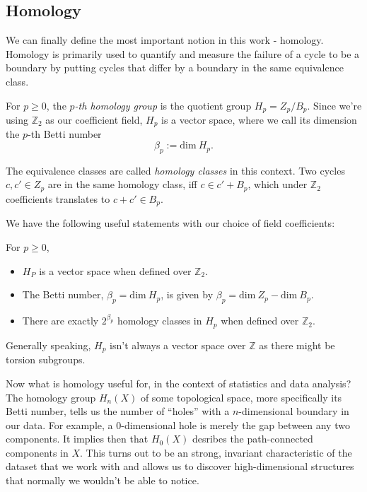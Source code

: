 \subsection{Homology}

We can finally define the most important notion in this work - homology. Homology is primarily used to quantify and measure the failure of a cycle to be a boundary by putting cycles that differ by a boundary in the same equivalence class.

\begin{definition}
  For $p \geq 0$, the \textit{$p$-th homology group} is the quotient group $H_{p} = Z_{p} / B_{p}$. Since we're using $\mathbb{Z}_{2}$ as our coefficient field, $H_{p}$ is a vector space, where we call its dimension the $p$-th Betti number
  \begin{equation*}
    \beta_{p} := \text{dim} \: H_{p}.
  \end{equation*}
\end{definition}

The equivalence classes are called \textit{homology classes} in this context. Two cycles $c, c' \in Z_{p}$ are in the same homology class, iff $c \in c' + B_{p}$, which under $\mathbb{Z}_{2}$ coefficients translates to $c + c' \in B_{p}$.

We have the following useful statements with our choice of field coefficients:

\begin{theorem}
  For $p \geq 0$,
  \begin{itemize}
  \item $H_{P}$ is a vector space when defined over $\mathbb{Z}_{2}$.
  \item The Betti number, $\beta_{p} = \text{dim}\:H_{p}$, is given by $\beta_{p} = \text{dim}\:Z_{p} - \text{dim}\:B_{p}$.
  \item There are exactly $2^{\beta_{p}}$ homology classes in $H_{p}$ when defined over $\mathbb{Z}_{2}$.
  \end{itemize}
\end{theorem}

Generally speaking, $H_{p}$ isn't always a vector space over $\mathbb{Z}$ as there might be torsion subgroups.

Now what is homology useful for, in the context of statistics and data analysis? The homology group $H_{n}(X)$ of some topological space, more specifically its Betti number, tells us the number of ``holes'' with a $n$-dimensional boundary in our data. For example, a $0$-dimensional hole is merely the gap between any two components. It implies then that $H_{0}(X)$ desribes the path-connected components in $X$. This turns out to be an strong, invariant characteristic of the dataset that we work with and allows us to discover high-dimensional structures that normally we wouldn't be able to notice.


